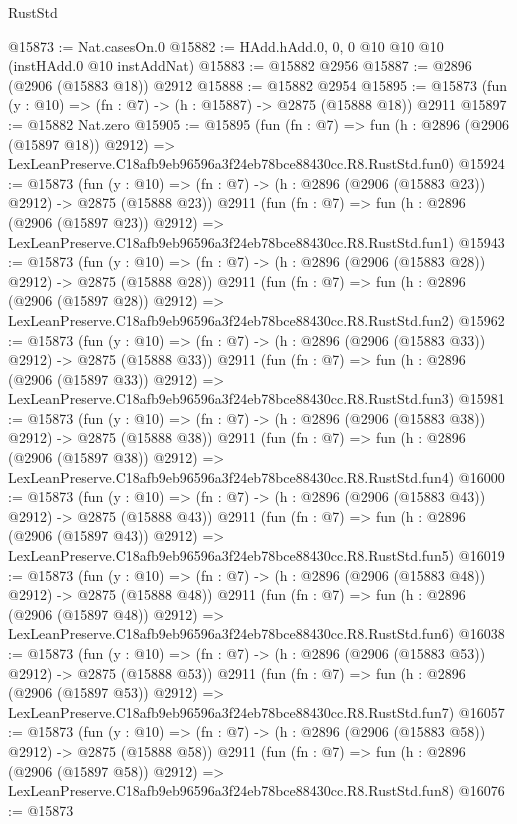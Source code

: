 \begin{lexlean}{RustStd}
\begin{coremodule}
@15873 := Nat.casesOn.{0}
@15882 := HAdd.hAdd.{0, 0, 0} @10 @10 @10 (instHAdd.{0} @10 instAddNat)
@15883 := @15882 @2956
@15887 := @2896 (@2906 (@15883 @18)) @2912
@15888 := @15882 @2954
@15895 := @15873 (fun (y : @10) => (fn : @7) -> (h : @15887) -> @2875 (@15888 @18)) @2911
@15897 := @15882 Nat.zero
@15905 := @15895
    (fun (fn : @7) =>
    fun (h : @2896 (@2906 (@15897 @18)) @2912) =>
    LexLeanPreserve.C18afb9eb96596a3f24eb78bce88430cc.R8.RustStd.fun0)
@15924 := @15873
    (fun (y : @10) => (fn : @7) -> (h : @2896 (@2906 (@15883 @23)) @2912) -> @2875 (@15888 @23))
    @2911
    (fun (fn : @7) =>
    fun (h : @2896 (@2906 (@15897 @23)) @2912) =>
    LexLeanPreserve.C18afb9eb96596a3f24eb78bce88430cc.R8.RustStd.fun1)
@15943 := @15873
    (fun (y : @10) => (fn : @7) -> (h : @2896 (@2906 (@15883 @28)) @2912) -> @2875 (@15888 @28))
    @2911
    (fun (fn : @7) =>
    fun (h : @2896 (@2906 (@15897 @28)) @2912) =>
    LexLeanPreserve.C18afb9eb96596a3f24eb78bce88430cc.R8.RustStd.fun2)
@15962 := @15873
    (fun (y : @10) => (fn : @7) -> (h : @2896 (@2906 (@15883 @33)) @2912) -> @2875 (@15888 @33))
    @2911
    (fun (fn : @7) =>
    fun (h : @2896 (@2906 (@15897 @33)) @2912) =>
    LexLeanPreserve.C18afb9eb96596a3f24eb78bce88430cc.R8.RustStd.fun3)
@15981 := @15873
    (fun (y : @10) => (fn : @7) -> (h : @2896 (@2906 (@15883 @38)) @2912) -> @2875 (@15888 @38))
    @2911
    (fun (fn : @7) =>
    fun (h : @2896 (@2906 (@15897 @38)) @2912) =>
    LexLeanPreserve.C18afb9eb96596a3f24eb78bce88430cc.R8.RustStd.fun4)
@16000 := @15873
    (fun (y : @10) => (fn : @7) -> (h : @2896 (@2906 (@15883 @43)) @2912) -> @2875 (@15888 @43))
    @2911
    (fun (fn : @7) =>
    fun (h : @2896 (@2906 (@15897 @43)) @2912) =>
    LexLeanPreserve.C18afb9eb96596a3f24eb78bce88430cc.R8.RustStd.fun5)
@16019 := @15873
    (fun (y : @10) => (fn : @7) -> (h : @2896 (@2906 (@15883 @48)) @2912) -> @2875 (@15888 @48))
    @2911
    (fun (fn : @7) =>
    fun (h : @2896 (@2906 (@15897 @48)) @2912) =>
    LexLeanPreserve.C18afb9eb96596a3f24eb78bce88430cc.R8.RustStd.fun6)
@16038 := @15873
    (fun (y : @10) => (fn : @7) -> (h : @2896 (@2906 (@15883 @53)) @2912) -> @2875 (@15888 @53))
    @2911
    (fun (fn : @7) =>
    fun (h : @2896 (@2906 (@15897 @53)) @2912) =>
    LexLeanPreserve.C18afb9eb96596a3f24eb78bce88430cc.R8.RustStd.fun7)
@16057 := @15873
    (fun (y : @10) => (fn : @7) -> (h : @2896 (@2906 (@15883 @58)) @2912) -> @2875 (@15888 @58))
    @2911
    (fun (fn : @7) =>
    fun (h : @2896 (@2906 (@15897 @58)) @2912) =>
    LexLeanPreserve.C18afb9eb96596a3f24eb78bce88430cc.R8.RustStd.fun8)
@16076 := @15873

\end{coremodule}
\end{lexlean}
